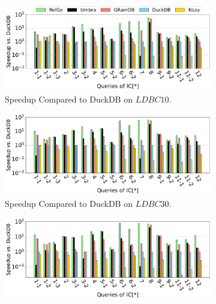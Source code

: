 \begin{figure}[ht]
    \centering
    \begin{subfigure}[b]{\linewidth}
        \centering
        \includegraphics[width=\linewidth]{./figures/exp/e2e_sf10.pdf}
        \vspace{-2em}
        \caption{Speedup Compared to DuckDB on $LDBC10$.}
        \label{fig:exp-e2e-sf10}
    \end{subfigure}
    \begin{subfigure}[b]{\linewidth}
        \centering
        \includegraphics[width=\linewidth]{./figures/exp/e2e_sf30.pdf}
        \vspace{-2em}
        \caption{Speedup Compared to DuckDB on $LDBC30$.}
        \label{fig:exp-e2e-sf30}
    \end{subfigure}
    \begin{subfigure}[b]{\linewidth}
        \centering
        \includegraphics[width=\linewidth]{./figures/exp/e2e_sf100.pdf}

\end{subfigure}
\end{figure}
